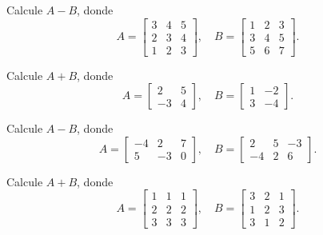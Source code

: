 \begin{ejercicio}
Calcule $A-B$, donde
\[
A=\begin{bmatrix} 3 & 4 & 5 \\ 2 & 3 & 4 \\ 1 & 2 & 3 \end{bmatrix}, \quad
B=\begin{bmatrix} 1 & 2 & 3 \\ 3 & 4 & 5 \\ 5 & 6 & 7 \end{bmatrix}.
\]
\end{ejercicio}
\muestraSolucion{
\[
A-B=\begin{bmatrix} 2 & 2 & 2 \\ -1 & -1 & -1 \\ -4 & -4 & -4 \end{bmatrix}.
\]
}

\begin{ejercicio}
Calcule $A+B$, donde
\[
A=\begin{bmatrix} 2 & 5 \\ -3 & 4 \end{bmatrix}, \quad
B=\begin{bmatrix} 1 & -2 \\ 3 & -4 \end{bmatrix}.
\]
\end{ejercicio}
\muestraSolucion{
\[
A+B=\begin{bmatrix} 3 & 3 \\ 0 & 0 \end{bmatrix}.
\]
}

\begin{ejercicio}
Calcule $A-B$, donde
\[
A=\begin{bmatrix} -4 & 2 & 7 \\ 5 & -3 & 0 \end{bmatrix}, \quad
B=\begin{bmatrix} 2 & 5 & -3 \\ -4 & 2 & 6 \end{bmatrix}.
\]
\end{ejercicio}
\muestraSolucion{
\[
A-B=\begin{bmatrix} -6 & -3 & 10 \\ 9 & -5 & -6 \end{bmatrix}.
\]
}

\begin{ejercicio}
Calcule $A+B$, donde
\[
A=\begin{bmatrix} 1 & 1 & 1 \\ 2 & 2 & 2 \\ 3 & 3 & 3 \end{bmatrix}, \quad
B=\begin{bmatrix} 3 & 2 & 1 \\ 1 & 2 & 3 \\ 3 & 1 & 2 \end{bmatrix}.
\]
\end{ejercicio}
\muestraSolucion{
\[
A+B=\begin{bmatrix} 4 & 3 & 2 \\ 3 & 4 & 5 \\ 6 & 4 & 5 \end{bmatrix}.
\]
}

